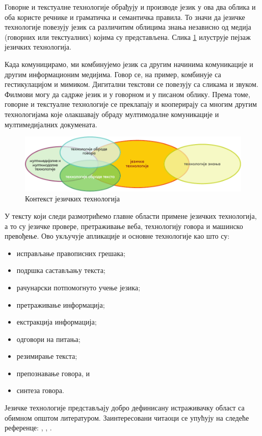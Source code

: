 {\begin{multicols}{2}
Говорне и текстуалне технологије обрађују и производе језик у ова два облика и оба користе речнике и граматичка и семантичка правила. То значи да језичке технологије повезују језик са различитим облицима знања независно од медија (говорних или текстуалних) којима су представљена. Слика \ref{fig:ltincontext_sr} илуструје пејзаж језичких технологија. 

Када комуницирамо, ми комбинујемо језик са другим начинима комуникације и другим информационим медијима. Говор се, на пример, комбинује са гестикулацијом и мимиком. Дигитални текстови се повезују са сликама и звуком. Филмови могу да садрже језик и у говорном и у писаном облику. Према томе, говорне и текстуалне технологије се преклапају и кооперирају са многим другим технологијама које олакшавају обраду мултимодалне комуникације и мултимедијалних докумената. 

\begin{figure}[htb]
  \center
  \includegraphics[width=\textwidth]{../_media/serbian/language_technologies}
  \caption{Контекст језичких технологија}
  \label{fig:ltincontext_sr}
\end{figure}

У тексту који следи размотрићемо главне области примене језичких технологија, а то су  језичке провере, претраживање веба, технологију говора и машинско превођење. Ово укључује апликације и основне технологије као што су:
\begin{itemize}
 \item исправљање правописних грешака;
 \item подршка састављању текста;
 \item рачунарски потпомогнуто учење језика;
 \item претраживање информација;
\item  екстракција информација;
 \item одговори на питања;
\item резимирање текста;
\item препознавање говора, и
\item  синтеза говора.
\end{itemize}
Језичке технологије представљају добро дефинисану истраживачку област са обимном општом литературом. Заинтересовани читаоци се упућују на следеће референце:  \cite{jurafsky-martin01},  \cite{manning-schuetze1},  \cite{lt-survey1}.


\end{multicols}}
